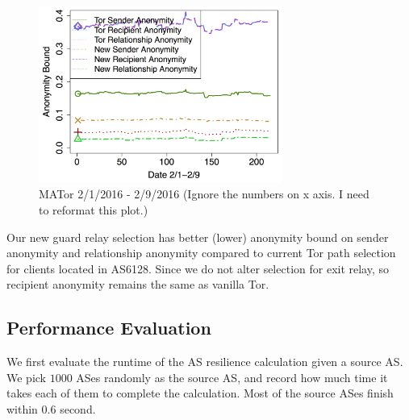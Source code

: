 \begin{figure}[ht!]
\centering
\includegraphics[width=80mm]{figure/mator}
\caption{MATor 2/1/2016 - 2/9/2016 (Ignore the numbers on x axis. I need to reformat this plot.) \label{fig_mator}}
\end{figure}

Our new guard relay selection has better (lower) anonymity bound on sender anonymity and relationship anonymity compared to current Tor path selection for clients located in AS6128. Since we do not alter selection for exit relay, so recipient anonymity remains the same as vanilla Tor. 




\subsection{Performance Evaluation}

We first evaluate the runtime of the AS resilience calculation given a source AS. We pick $1000$ ASes randomly as the source AS, and record how much time it takes each of them to complete the calculation. Most of the source ASes finish within $0.6$ second. \\


